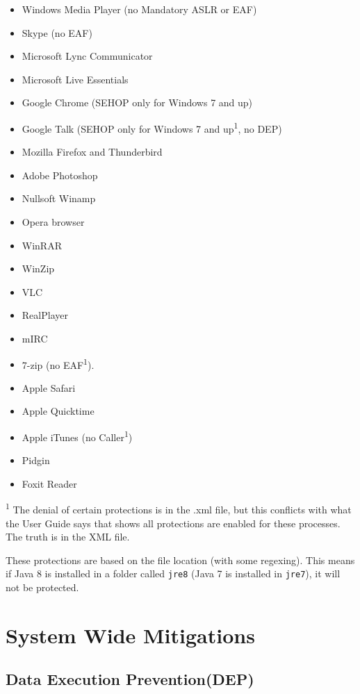 \documentclass[]{article}
\begin{document}
\begin{itemize}
\item
  Windows Media Player (no Mandatory ASLR or EAF)
\item
  Skype (no EAF)
\item
  Microsoft Lync Communicator
\item
  Microsoft Live Essentials
\item
  Google Chrome (SEHOP only for Windows 7 and up)
\item
  Google Talk (SEHOP only for Windows 7 and up\textsuperscript{1}, no
  DEP)
\item
  Mozilla Firefox and Thunderbird
\item
  Adobe Photoshop
\item
  Nullsoft Winamp
\item
  Opera browser
\item
  WinRAR
\item
  WinZip
\item
  VLC
\item
  RealPlayer
\item
  mIRC
\item
  7-zip (no EAF\textsuperscript{1}).
\item
  Apple Safari
\item
  Apple Quicktime
\item
  Apple iTunes (no Caller\textsuperscript{1})
\item
  Pidgin
\item
  Foxit Reader
\end{itemize}

\textsuperscript{1} The denial of certain protections is in the .xml
file, but this conflicts with what the User Guide says that shows all
protections are enabled for these processes. The truth is in the XML
file.

These protections are based on the file location (with some regexing).
This means if Java 8 is installed in a folder called \texttt{jre8} (Java
7 is installed in \texttt{jre7}), it will not be protected.









\section{System Wide Mitigations}\label{system-wide-mitigations}

\subsection{Data Execution Prevention(DEP)}\label{system_dep}
\end{document}

